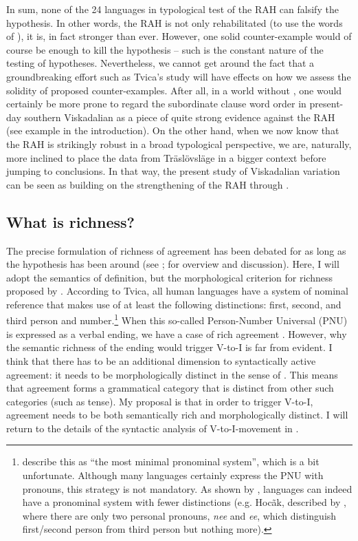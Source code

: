 \documentclass[output=paper,colorlinks,citecolor=brown,draft,draftmode]{langscibook}
\begin{document}
In sum, none of the 24 languages in  typological test of the RAH can falsify the hypothesis. In other words, the RAH is not only rehabilitated (to use the words of \citealt{KoenemanZeijlstra2014}), it is, in fact stronger than ever. However, one solid counter-example would of course be enough to kill the hypothesis – such is the constant nature of the testing of hypotheses. Nevertheless, we cannot get around the fact that a groundbreaking effort such as Tvica’s study will have effects on how we assess the solidity of proposed counter-examples. After all, in a world without \citet{Tvica2017}, one would certainly be more prone to regard the subordinate clause word order in present-day southern Viskadalian as a piece of quite strong evidence against the RAH (see example  in the introduction). On the other hand, when we now know that the RAH is strikingly robust in a broad typological perspective, we are, naturally, more inclined to place the data from Träslövsläge in a bigger context before jumping to conclusions. In that way, the present study of Viskadalian variation can be seen as building on the strengthening of the RAH through \citet{Tvica2017}.


\subsection{What is richness?}\label{sec:petzell:4.2}


The precise formulation of richness of agreement has been debated for as long as the hypothesis has been around (see \citealt{Vikner1997}; \citealt{Rohrbacher1999} for overview and discussion). Here, I will adopt the semantics of  definition, but the morphological criterion for richness proposed by \citet{BobaljikThrainsson1998}. According to Tvica, all human languages have a system of nominal reference that makes use of at least the following distinctions: first, second, and third person and number.\footnote{\citet[573–574]{KoenemanZeijlstra2014} describe this as “the most minimal pronominal system”, which is a bit unfortunate. Although many languages certainly express the PNU with pronouns, this strategy is not mandatory. As shown by \citet{Harbour2016}, languages can indeed have a pronominal system with fewer distinctions (e.g. Hocãk, described by \citet{Lipkind1945}, where there are only two personal pronouns, \textit{nee} and \textit{ee}, which distinguish first/second person from third person but nothing more).} When this so-called Person-Number Universal (PNU) is expressed as a verbal ending, we have a case of rich agreement \citep[32]{Tvica2017}. However, why the semantic richness of the ending would trigger V-to-I is far from evident. I think that there has to be an additional dimension to syntactically active agreement: it needs to be morphologically distinct in the sense of \citet{BobaljikThrainsson1998}. This means that agreement forms a grammatical category that is distinct from other such categories (such as tense). My proposal is that in order to trigger V-to-I, agreement needs to be both semantically rich and morphologically distinct. I will return to the details of the syntactic analysis of V-to-I-movement in .
\end{document}
